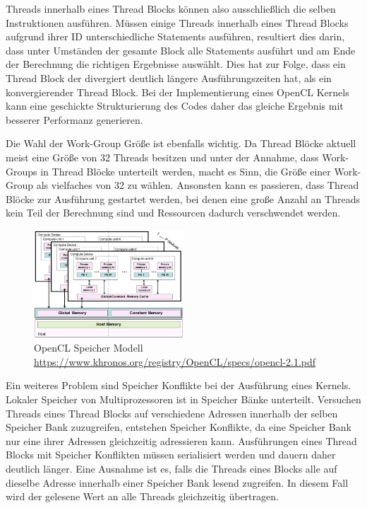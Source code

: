 Threads innerhalb eines Thread Blocks können also ausschließlich die selben Instruktionen ausführen.
Müssen einige Threads innerhalb eines Thread Blocks aufgrund ihrer ID unterschiedliche Statements ausführen, resultiert dies darin, dass unter Umständen der gesamte Block alle Statements ausführt und am Ende der Berechnung die richtigen Ergebnisse auswählt.
Dies hat zur Folge, dass ein Thread Block der divergiert deutlich längere Ausführungszeiten hat, als ein konvergierender Thread Block.
Bei der Implementierung eines OpenCL Kernels kann eine geschickte Strukturierung des Codes daher das gleiche Ergebnis mit besserer Performanz generieren.

Die Wahl der Work-Group Größe ist ebenfalls wichtig.
Da Thread Blöcke aktuell meist eine Größe von 32 Threads besitzen und unter der Annahme, dass Work-Groups in Thread Blöcke unterteilt werden, macht es Sinn, die Größe einer Work-Group als vielfaches von 32 zu wählen.
Ansonsten kann es passieren, dass Thread Blöcke zur Ausführung gestartet werden, bei denen eine große Anzahl an Threads kein Teil der Berechnung sind und Ressourcen dadurch verschwendet werden.

\begin{figure}
	\centering
	\includegraphics[width=0.5\textwidth]{../../Grafiken/OpenCL-Memory-Model.PNG}
	\caption{OpenCL Speicher Modell \url{https://www.khronos.org/registry/OpenCL/specs/opencl-2.1.pdf}}
	\label{fig::ga06}
\end{figure} 
Ein weiteres Problem sind Speicher Konflikte bei der Ausführung eines Kernels.
Lokaler Speicher von Multiprozessoren ist in Speicher Bänke unterteilt.
Versuchen Threads eines Thread Blocks auf verschiedene Adressen innerhalb der selben Speicher Bank zuzugreifen, entstehen Speicher Konflikte, da eine Speicher Bank nur eine ihrer Adressen gleichzeitig adressieren kann.
Ausführungen eines Thread Blocks mit Speicher Konflikten müssen serialisiert werden und dauern daher deutlich länger.
Eine Ausnahme ist es, falls die Threads eines Blocks alle auf dieselbe Adresse innerhalb einer Speicher Bank lesend zugreifen.
In diesem Fall wird der gelesene Wert an alle Threads gleichzeitig übertragen.
